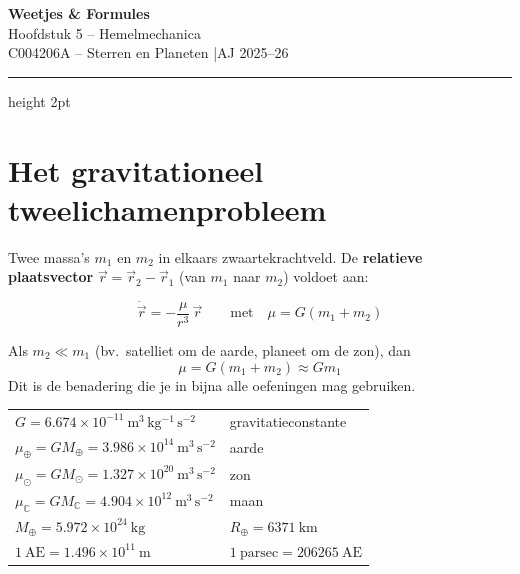 \documentclass[11pt, a4paper]{article}
\newcommand{\AstrE}{\mathrm{AE}}
\begin{document}

\begin{center}
  {\LARGE\bfseries\color{blauw} Weetjes \& Formules}\\[4pt]
  {\large Hoofdstuk 5 – Hemelmechanica}\\[2pt]
  {\normalsize C004206A – Sterren en Planeten \quad|\quad AJ 2025--26}
\end{center}
\vspace{0.3cm}
\hrule height 2pt \vspace{0.5cm}

\tableofcontents
\newpage

\section{Het gravitationeel tweelichamenprobleem}

Twee massa's $m_1$ en $m_2$ in elkaars zwaartekrachtveld. De \textbf{relatieve plaatsvector}
$\vec{r} = \vec{r}_2 - \vec{r}_1$ (van $m_1$ naar $m_2$) voldoet aan:

\begin{formule}[Bewegingsvergelijking]
\[
  \ddot{\vec{r}} = -\frac{\mu}{r^3}\,\vec{r}
  \qquad \text{met} \quad \mu = G(m_1 + m_2)
\]
\end{formule}

\begin{weetje}
Als $m_2 \ll m_1$ (bv.\ satelliet om de aarde, planeet om de zon), dan
\[
  \mu = G(m_1 + m_2) \approx G m_1
\]
Dit is de benadering die je in bijna alle oefeningen mag gebruiken.
\end{weetje}

\begin{weetje}
\renewcommand{\arraystretch}{1.3}
\begin{tabular}{ll}
  $G = 6.674 \times 10^{-11}\ \mathrm{m^3\,kg^{-1}\,s^{-2}}$ & gravitatieconstante \\
  $\mu_\oplus = GM_\oplus = 3.986 \times 10^{14}\ \mathrm{m^3\,s^{-2}}$ & aarde \\
  $\mu_\odot = GM_\odot = 1.327 \times 10^{20}\ \mathrm{m^3\,s^{-2}}$ & zon \\
  $\mu_\mathbb{C} = GM_\mathbb{C} = 4.904 \times 10^{12}\ \mathrm{m^3\,s^{-2}}$ & maan \\
  $M_\oplus = 5.972 \times 10^{24}\ \mathrm{kg}$ & $R_\oplus = 6371\ \mathrm{km}$ \\
  $1\ \AstrE = 1.496 \times 10^{11}\ \mathrm{m}$ & $1\ \mathrm{parsec} = 206265\ \AstrE$ \\
\end{tabular}
\end{weetje}
\end{document}
